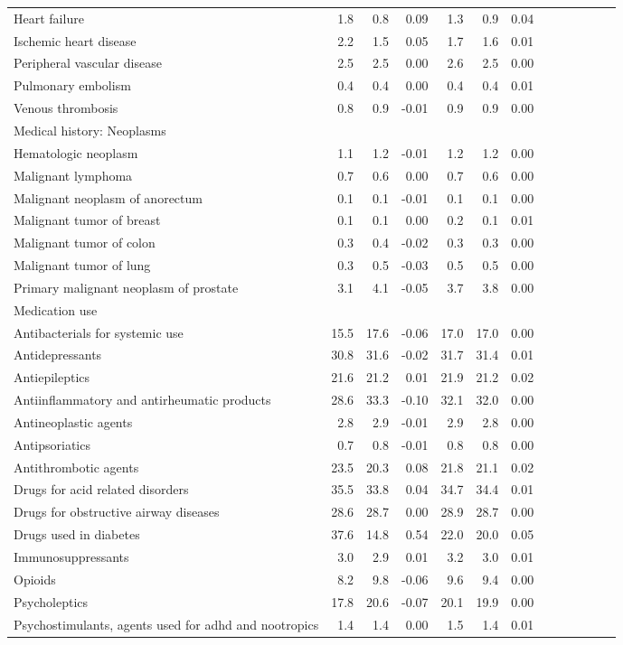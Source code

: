 \documentclass[11pt,]{article}
\begin{document}
\begin{longtable}{lrrrrrrrrrrrr}
      Heart failure &  1.8 &  0.8 &  0.09 &  1.3 &  0.9 &  0.04 \\ 
      Ischemic heart disease &  2.2 &  1.5 &  0.05 &  1.7 &  1.6 &  0.01 \\ 
      Peripheral vascular disease &  2.5 &  2.5 &  0.00 &  2.6 &  2.5 &  0.00 \\ 
      Pulmonary embolism &  0.4 &  0.4 &  0.00 &  0.4 &  0.4 &  0.01 \\ 
      Venous thrombosis &  0.8 &  0.9 & -0.01 &  0.9 &  0.9 &  0.00 \\ 
  Medical history: Neoplasms &    &    &     &    &    &     \\ 
      Hematologic neoplasm &  1.1 &  1.2 & -0.01 &  1.2 &  1.2 &  0.00 \\ 
      Malignant lymphoma &  0.7 &  0.6 &  0.00 &  0.7 &  0.6 &  0.00 \\ 
      Malignant neoplasm of anorectum &  0.1 &  0.1 & -0.01 &  0.1 &  0.1 &  0.00 \\ 
      Malignant tumor of breast &  0.1 &  0.1 &  0.00 &  0.2 &  0.1 &  0.01 \\ 
      Malignant tumor of colon &  0.3 &  0.4 & -0.02 &  0.3 &  0.3 &  0.00 \\ 
      Malignant tumor of lung &  0.3 &  0.5 & -0.03 &  0.5 &  0.5 &  0.00 \\ 
      Primary malignant neoplasm of prostate &  3.1 &  4.1 & -0.05 &  3.7 &  3.8 &  0.00 \\ 
  Medication use &    &    &     &    &    &     \\ 
      Antibacterials for systemic use & 15.5 & 17.6 & -0.06 & 17.0 & 17.0 &  0.00 \\ 
      Antidepressants & 30.8 & 31.6 & -0.02 & 31.7 & 31.4 &  0.01 \\ 
      Antiepileptics & 21.6 & 21.2 &  0.01 & 21.9 & 21.2 &  0.02 \\ 
      Antiinflammatory and antirheumatic products & 28.6 & 33.3 & -0.10 & 32.1 & 32.0 &  0.00 \\ 
      Antineoplastic agents &  2.8 &  2.9 & -0.01 &  2.9 &  2.8 &  0.00 \\ 
      Antipsoriatics &  0.7 &  0.8 & -0.01 &  0.8 &  0.8 &  0.00 \\ 
      Antithrombotic agents & 23.5 & 20.3 &  0.08 & 21.8 & 21.1 &  0.02 \\ 
      Drugs for acid related disorders & 35.5 & 33.8 &  0.04 & 34.7 & 34.4 &  0.01 \\ 
      Drugs for obstructive airway diseases & 28.6 & 28.7 &  0.00 & 28.9 & 28.7 &  0.00 \\ 
      Drugs used in diabetes & 37.6 & 14.8 &  0.54 & 22.0 & 20.0 &  0.05 \\ 
      Immunosuppressants &  3.0 &  2.9 &  0.01 &  3.2 &  3.0 &  0.01 \\ 
      Opioids &  8.2 &  9.8 & -0.06 &  9.6 &  9.4 &  0.00 \\ 
      Psycholeptics & 17.8 & 20.6 & -0.07 & 20.1 & 19.9 &  0.00 \\ 
      Psychostimulants, agents used for adhd and nootropics &  1.4 &  1.4 &  0.00 &  1.5 &  1.4 &  0.01 \\ 
   \bottomrule\end{longtable}
\end{document}
